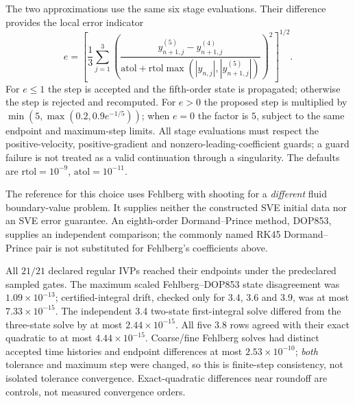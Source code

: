 The two approximations use the same six stage evaluations. Their difference
provides the local error indicator
\begin{equation}
 e=\left[\frac13\sum_{j=1}^3
 \left(\frac{y_{n+1,j}^{(5)}-y_{n+1,j}^{(4)}}
 {\mathrm{atol}+\mathrm{rtol}\max(|y_{n,j}|,|y_{n+1,j}^{(5)}|)}\right)^2
 \right]^{1/2}.
 \label{eq:sve-rkf-error}
\end{equation}
For $e\leq1$ the step is accepted and the fifth-order state is propagated;
otherwise the step is rejected and recomputed. For $e>0$ the proposed step
is multiplied by $\min(5,\max(0.2,0.9e^{-1/5}))$; when $e=0$ the
factor is $5$, subject to the same endpoint and maximum-step limits.
All stage evaluations must respect the positive-velocity, positive-gradient
and nonzero-leading-coefficient guards; a guard failure is not treated as
a valid continuation through a singularity. The defaults are
$\mathrm{rtol}=10^{-9}$, $\mathrm{atol}=10^{-11}$.

The reference for this choice uses Fehlberg with shooting for a
\emph{different} fluid boundary-value problem. It supplies neither the
constructed SVE initial data nor an SVE error guarantee. An eighth-order
Dormand--Prince method, DOP853, supplies an independent comparison;
the commonly named RK45 Dormand--Prince pair is not substituted for
Fehlberg's coefficients above.

All $21/21$ declared regular IVPs reached their endpoints under the
predeclared sampled gates. The maximum scaled Fehlberg--DOP853 state
disagreement was $1.09\times10^{-13}$; certified-integral drift, checked
only for 3.4, 3.6 and 3.9, was at most $7.33\times10^{-15}$.
The independent 3.4 two-state first-integral solve differed from the
three-state solve by at most $2.44\times10^{-15}$.
All five 3.8 rows agreed with their exact quadratic to at most
$4.44\times10^{-15}$. Coarse/fine Fehlberg solves had distinct accepted
time histories and endpoint differences at most $2.53\times10^{-10}$;
\emph{both} tolerance and maximum step were changed, so this is finite-step
consistency, not isolated tolerance convergence. Exact-quadratic differences
near roundoff are controls, not measured convergence orders.


